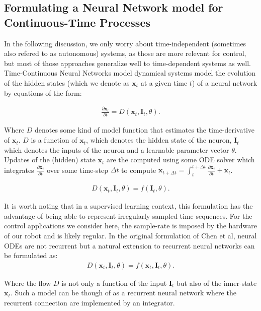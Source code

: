 \subsection{Formulating a Neural Network model for Continuous-Time Processes}

In the following discussion, we only worry about time-independent (sometimes also refered to as autonomous) systems, as those are more relevant for control, but most of those approaches generalize well to time-dependent systems as well. Time-Continuous Neural Networks model dynamical systems model the evolution of the hidden states (which we denote as $\bm{x}_t$ at a given time $t$) of a neural network by equations of the form: 

\begin{align}
    \frac{\partial \bm{x}_t}{\partial t} = D(\bm{x}_t, \bm{I}_t, \theta).
\end{align}
 
 Where $D$ denotes some kind of model function that estimates the time-derivative of $\bm{x}_t$. $D$ is a function of $\bm{x}_t$, which denotes the hidden state of the neuron, $\bm{I}_t$ which denotes the inputs of the neuron and a learnable parameter vector $\theta$. Updates of the (hidden) state $\bm{x}_t$ are the computed using some ODE solver which integrates $\frac{\partial \bm{x}_t}{\partial t}$ over some time-step $\Delta t$ to compute $\bm{x}_{t+\Delta t} = \int_t^{t+\Delta t} \frac{\partial \bm{x}_t}{\partial t} + \bm{x}_t$.
 
 
 \begin{align}
    D(\bm{x}_t, \bm{I}_t, \theta) =  f(\bm{I}_t, \theta).
\end{align}
 
 It is worth noting that in a supervised learning context, this formulation has the advantage of being able to represent irregularly sampled time-sequences. For the control applications we consider here, the sample-rate is imposed by the hardware of our robot and is likely regular. In the original formulation of Chen et al, neural ODEs are not recurrent but a natural extension to recurrent neural networks can be formulated as: \\

 \begin{align}
    D(\bm{x}_t, \bm{I}_t, \theta) =  f(\bm{x}_t, \bm{I}_t, \theta).
\end{align}
 
Where the flow $D$ is not only a function of the input $\bm{I}_t$ but also of the inner-state $\bm{x}_t$. Such a model can be though of as a recurrent neural network where the recurrent connection are implemented by an integrator.

